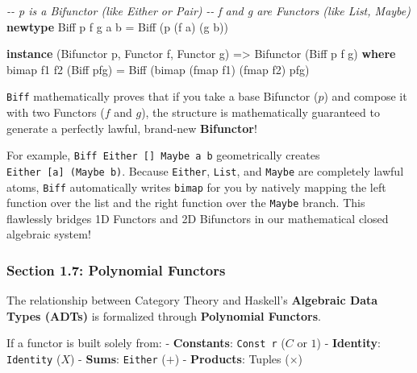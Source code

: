 \documentclass[
]{article}
\newenvironment{Shaded}{}{}
\newcommand{\CommentTok}[1]{\textcolor[rgb]{0.38,0.63,0.69}{\textit{#1}}}
\newcommand{\DataTypeTok}[1]{\textcolor[rgb]{0.56,0.13,0.00}{#1}}
\newcommand{\FunctionTok}[1]{\textcolor[rgb]{0.02,0.16,0.49}{#1}}
\newcommand{\KeywordTok}[1]{\textcolor[rgb]{0.00,0.44,0.13}{\textbf{#1}}}
\newcommand{\NormalTok}[1]{#1}
\newcommand{\OtherTok}[1]{\textcolor[rgb]{0.00,0.44,0.13}{#1}}
\begin{document}
\begin{Shaded}
\begin{Highlighting}[]
\CommentTok{{-}{-} \textquotesingle{}p\textquotesingle{} is a Bifunctor (like Either or Pair)}
\CommentTok{{-}{-} \textquotesingle{}f\textquotesingle{} and \textquotesingle{}g\textquotesingle{} are Functors (like List, Maybe)}
\KeywordTok{newtype} \DataTypeTok{Biff}\NormalTok{ p f g a b }\OtherTok{=} \DataTypeTok{Biff}\NormalTok{ (p (f a) (g b))}

\KeywordTok{instance}\NormalTok{ (}\DataTypeTok{Bifunctor}\NormalTok{ p, }\DataTypeTok{Functor}\NormalTok{ f, }\DataTypeTok{Functor}\NormalTok{ g) }\OtherTok{=\textgreater{}} \DataTypeTok{Bifunctor}\NormalTok{ (}\DataTypeTok{Biff}\NormalTok{ p f g) }\KeywordTok{where}
\NormalTok{    bimap f1 f2 (}\DataTypeTok{Biff}\NormalTok{ pfg) }\OtherTok{=} \DataTypeTok{Biff}\NormalTok{ (bimap (}\FunctionTok{fmap}\NormalTok{ f1) (}\FunctionTok{fmap}\NormalTok{ f2) pfg)}
\end{Highlighting}
\end{Shaded}

\texttt{Biff} mathematically proves that if you take a base Bifunctor
(\(p\)) and compose it with two Functors (\(f\) and \(g\)), the
structure is mathematically guaranteed to generate a perfectly lawful,
brand-new \textbf{Bifunctor}!

For example, \texttt{Biff\ Either\ {[}{]}\ Maybe\ a\ b} geometrically
creates \texttt{Either\ {[}a{]}\ (Maybe\ b)}. Because \texttt{Either},
\texttt{List}, and \texttt{Maybe} are completely lawful atoms,
\texttt{Biff} automatically writes \texttt{bimap} for you by natively
mapping the left function over the list and the right function over the
\texttt{Maybe} branch. This flawlessly bridges 1D Functors and 2D
Bifunctors in our mathematical closed algebraic system!

\subsubsection{Section 1.7: Polynomial
Functors}\label{section-1.7-polynomial-functors}

The relationship between Category Theory and Haskell's \textbf{Algebraic
Data Types (ADTs)} is formalized through \textbf{Polynomial Functors}.

If a functor is built solely from: - \textbf{Constants}:
\texttt{Const\ r} (\(C\) or \(1\)) - \textbf{Identity}:
\texttt{Identity} (\(X\)) - \textbf{Sums}: \texttt{Either} (\(+\)) -
\textbf{Products}: Tuples (\(\times\))
\end{document}
